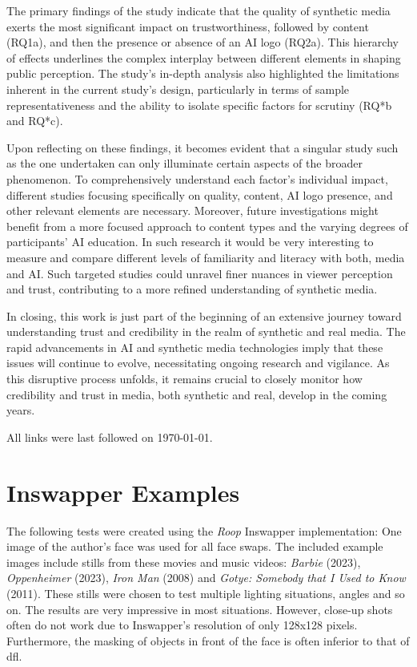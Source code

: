 \documentclass[
  a4paper,  %
  twoside,  %
  bibliography=totoc,
  headsepline,
  cleardoublepage=empty,
  parskip=half,
  draft=false
]{scrbook}
\begin{document}
The primary findings of the study indicate that the quality of synthetic media exerts the most significant impact on trustworthiness, followed by content (RQ1a), and then the presence or absence of an AI logo (RQ2a). This hierarchy of effects underlines the complex interplay between different elements in shaping public perception. The study's in-depth analysis also highlighted the limitations inherent in the current study's design, particularly in terms of sample representativeness and the ability to isolate specific factors for scrutiny (RQ*b and RQ*c).

Upon reflecting on these findings, it becomes evident that a singular study such as the one undertaken can only illuminate certain aspects of the broader phenomenon. To comprehensively understand each factor's individual impact, different studies focusing specifically on quality, content, AI logo presence, and other relevant elements are necessary. Moreover, future investigations might benefit from a more focused approach to content types and the varying degrees of participants' AI education. In such research it would be very interesting to measure and compare different levels of familiarity and literacy with both, media and AI. Such targeted studies could unravel finer nuances in viewer perception and trust, contributing to a more refined understanding of synthetic media.

In closing, this work is just part of the beginning of an extensive journey toward understanding trust and credibility in the realm of synthetic and real media. The rapid advancements in AI and synthetic media technologies imply that these issues will continue to evolve, necessitating ongoing research and vigilance. As this disruptive process unfolds, it remains crucial to closely monitor how credibility and trust in media, both synthetic and real, develop in the coming years.


\printbibliography
All links were last followed on \today{}.

\appendix
\chapter{Inswapper Examples}
\label{chap:insightface-demos}
The following tests were created using the \textit{Roop} Inswapper implementation: One image of the author's face was used for all face swaps. The included example images include stills from these movies and music videos: \textit{Barbie} (2023), \textit{Oppenheimer} (2023), \textit{Iron Man} (2008) and \textit{Gotye: Somebody that I Used to Know} (2011).
These stills were chosen to test multiple lighting situations, angles and so on. The results are very impressive in most situations. However, close-up shots often do not work due to Inswapper's resolution of only 128x128 pixels. Furthermore, the masking of objects in front of the face is often inferior to that of \gls{dfl}.
\end{document}
